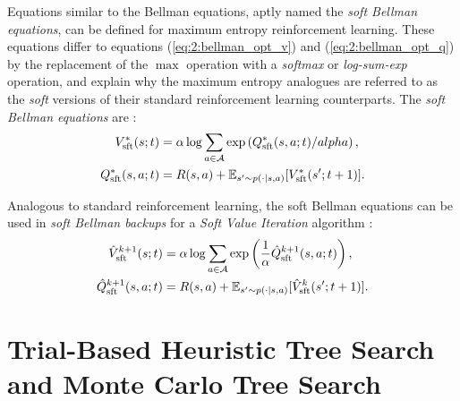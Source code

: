         Equations similar to the Bellman equations, aptly named the \textit{soft Bellman equations}, can be defined for maximum entropy reinforcement learning. These equations differ to equations (\ref{eq:2:bellman_opt_v}) and (\ref{eq:2:bellman_opt_q}) by the replacement of the $\max$ operation with a \textit{softmax} or \textit{log-sum-exp} operation, and explain why the maximum entropy analogues are referred to as the \textit{soft} versions of their standard reinforcement learning counterparts. The \textit{soft Bellman equations} are \cite{deep_energy_policies}:
        \begin{align}
            V_{{\textnormal{sft}}}^*(s;t) &= \alpha \log \sum_{a\in\mathcal{A}} \exp\left( Q_{{\textnormal{sft}}}^*(s,a;t) / alpha \right), \label{eq:2:sft_bellman_opt_v} \\
            Q_{{\textnormal{sft}}}^*(s,a;t) &= R(s,a) + \mathbb{E}_{s'\sim p(\cdot|s,a)} [V_{{\textnormal{sft}}}^*(s';t+1)]. \label{eq:2:sft_bellman_opt_q}
        \end{align} 

        Analogous to standard reinforcement learning, the soft Bellman equations can be used in \textit{soft Bellman backups} for a \textit{Soft Value Iteration} algorithm \cite{deep_energy_policies}:
        \begin{align}
            \hat{V}_{{\textnormal{sft}}}^{k+1}(s;t) &= \alpha \log \sum_{a\in\mathcal{A}} \exp\left( \frac{1}{\alpha} \hat{Q}_{{\textnormal{sft}}}^{k+1}(s,a;t) \right), \label{eq:2:soft_value_iter_v_backup} \\
            \hat{Q}_{{\textnormal{sft}}}^{k+1}(s,a;t) &= R(s,a) + \mathbb{E}_{s'\sim p(\cdot|s,a)} [\hat{V}_{{\textnormal{sft}}}^k(s';t+1)]. \label{eq:2:soft_value_iter_q_backup}
        \end{align}

        














\section{Trial-Based Heuristic Tree Search and Monte Carlo Tree Search}
\label{sec:2-4-thts}

